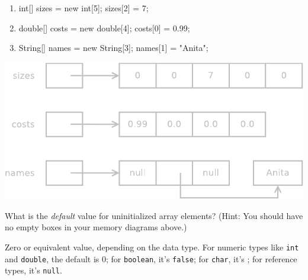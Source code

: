\begin{minipage}{0.46\linewidth}

\begin{enumerate}

\item
\begin{javalst}
int[] sizes = new int[5];
sizes[2] = 7;
\end{javalst}

\item
\begin{javalst}
double[] costs = new double[4];
costs[0] = 0.99;
\end{javalst}

\item
\begin{javalst}
String[] names = new String[3];
names[1] = "Anita";
\end{javalst}

\end{enumerate}

\end{minipage}
\hfill
\begin{minipage}{0.53\linewidth}

\begin{answer}[130pt]
\includegraphics[width=\linewidth]{decl-array.pdf}
\end{answer}

\end{minipage}


\Q What is the \emph{default} value for uninitialized array elements?
(Hint: You should have no empty boxes in your memory diagrams above.)

\begin{answer}
Zero or equivalent value, depending on the data type.
For numeric types like {\tt int} and {\tt double}, the default is 0; for {\tt boolean}, it's {\tt false}; for {\tt char}, it's {\tt {}\qs}; for reference types, it's {\tt null}.
\end{answer}


